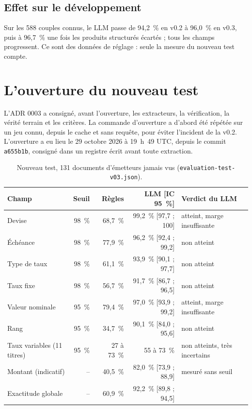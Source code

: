 \documentclass[11pt,a4paper]{article}
\begin{document}
\subsection{Effet sur le développement}

Sur les 588 couples connus, le LLM passe de 94,2~\% en v0.2 à 96,0~\% en v0.3, puis à 96,7~\% une fois les produits structurés écartés ; tous les champs progressent. Ce sont des données de réglage : seule la mesure du nouveau test compte.

\section{L'ouverture du nouveau test}

L'ADR 0003 a consigné, avant l'ouverture, les extracteurs, la vérification, la vérité terrain et les critères. La commande d'ouverture a d'abord été répétée sur un jeu connu, depuis le cache et sans requête, pour éviter l'incident de la v0.2. L'ouverture a eu lieu le 29 octobre 2026 à 19~h~49 UTC, depuis le commit \texttt{a655b1b}, consigné dans un registre écrit avant toute extraction.

\begin{table}[H]
\small
\begin{tabularx}{\linewidth}{Yrrrl}
\toprule
\textbf{Champ} & \textbf{Seuil} & \textbf{Règles} & \textbf{LLM [IC 95~\%]} & \textbf{Verdict du LLM} \\
\midrule
Devise & 98~\% & 68,7~\% & 99,2~\% [97,7 ; 100] & atteint, marge insuffisante \\
Échéance & 98~\% & 77,9~\% & 96,2~\% [92,4 ; 99,2] & non atteint \\
Type de taux & 98~\% & 61,1~\% & 93,9~\% [90,1 ; 97,7] & non atteint \\
Taux fixe & 98~\% & 56,7~\% & 91,7~\% [86,7 ; 96,5] & non atteint \\
Valeur nominale & 95~\% & 79,4~\% & 97,0~\% [93,9 ; 99,2] & atteint, marge insuffisante \\
Rang & 95~\% & 34,7~\% & 90,1~\% [84,0 ; 95,6] & non atteint \\
Taux variables (11 titres) & 95~\% & 27 à 73~\% & 55 à 73~\% & non atteints, très incertains \\
Montant (indicatif) & -- & 40,5~\% & 82,0~\% [73,9 ; 88,9] & mesuré sans seuil \\
\midrule
Exactitude globale & -- & 60,9~\% & 92,2~\% [89,8 ; 94,5] & \\
\bottomrule
\end{tabularx}
\caption{Nouveau test, 131 documents d'émetteurs jamais vus (\texttt{evaluation-test-v03.json}).}
\end{table}
\end{document}
